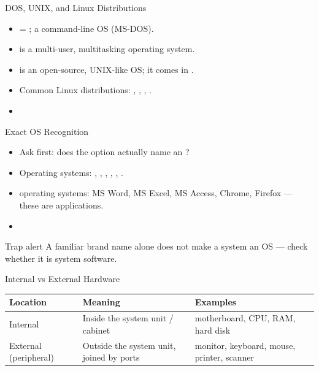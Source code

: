 \documentclass[aspectratio=169]{beamer}
\begin{document}
\begin{frame}{DOS, UNIX, and Linux Distributions}
  \begin{itemize}
    \item {} = ; a command-line OS
      (MS-DOS).
    \item {} is a multi-user, multitasking operating system.
    \item {} is an open-source, UNIX-like OS; it comes in
      .
    \item Common Linux distributions: , ,
      , .
    \item {}
  \end{itemize}
\end{frame}

\begin{frame}{Exact OS Recognition}
  \begin{itemize}
    \item Ask first: does the option actually name an ?
    \item Operating systems: , , ,
      , , .
    \item {} operating systems: MS Word, MS Excel, MS Access,
      Chrome, Firefox --- these are applications.
    \item {}
  \end{itemize}
  \begin{alertblock}{Trap alert}
    A familiar brand name alone does not make a system an OS --- check
    whether it is system software.
  \end{alertblock}
\end{frame}

\begin{frame}{Internal vs External Hardware}
  \begin{center}
    \begin{tabular}{p{}p{}p{}}
      \toprule
      \textbf{Location} & \textbf{Meaning} & \textbf{Examples} \\
      \midrule
      Internal & Inside the system unit / cabinet & motherboard, CPU, RAM, hard disk \\
      External (peripheral) & Outside the system unit, joined by ports & monitor, keyboard, mouse, printer, scanner \\
      \bottomrule
    \end{tabular}
  \end{center}
  \vspace{0.25cm}
\end{frame}
\end{document}
